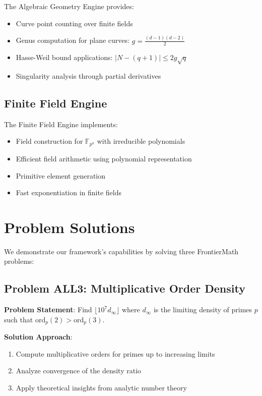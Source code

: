 \documentclass[11pt]{article}
\begin{document}
The Algebraic Geometry Engine provides:

\begin{itemize}
\item Curve point counting over finite fields
\item Genus computation for plane curves: $g = \frac{(d-1)(d-2)}{2}$
\item Hasse-Weil bound applications: $|N - (q+1)| \leq 2g\sqrt{q}$
\item Singularity analysis through partial derivatives
\end{itemize}

\subsection{Finite Field Engine}

The Finite Field Engine implements:

\begin{itemize}
\item Field construction for $\mathbb{F}_{p^n}$ with irreducible polynomials
\item Efficient field arithmetic using polynomial representation
\item Primitive element generation
\item Fast exponentiation in finite fields
\end{itemize}

\section{Problem Solutions}

We demonstrate our framework's capabilities by solving three FrontierMath problems:

\subsection{Problem ALL3: Multiplicative Order Density}

\textbf{Problem Statement}: Find $\lfloor 10^7 d_{\infty} \rfloor$ where $d_{\infty}$ is the limiting density of primes $p$ such that $\text{ord}_p(2) > \text{ord}_p(3)$.

\textbf{Solution Approach}:
\begin{enumerate}
\item Compute multiplicative orders for primes up to increasing limits
\item Analyze convergence of the density ratio
\item Apply theoretical insights from analytic number theory
\end{enumerate}
\end{document}
